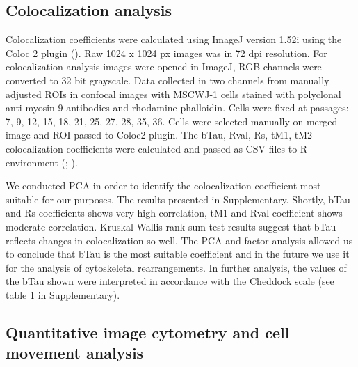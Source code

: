 \documentclass[alpha-refs]{wiley-article}
\begin{document}
\subsection{Colocalization analysis}

Colocalization coefficients were calculated using ImageJ version 1.52i using the Coloc 2 plugin (\cite{rueden2017imagej2}).
Raw 1024 x 1024 px images was in 72 dpi resolution.
For colocalization analysis images were opened in ImageJ, RGB channels were converted to 32 bit grayscale.
Data collected in two channels from manually adjusted ROIs in confocal images with MSCWJ-1 cells stained with polyclonal anti-myosin-9 antibodies and rhodamine phalloidin. Cells were fixed at passages: 7, 9, 12, 15, 18, 21, 25, 27, 28, 35, 36.
Cells were selected manually on merged image and ROI passed to Coloc2 plugin.
The bTau, Rval, Rs, tM1, tM2 colocalization coefficients were calculated and passed as CSV files to R environment (\cite{adler2008replicate}; \cite{bergholm2010analysis}).

We conducted PCA in order to identify the colocalization coefficient most suitable for our purposes.
The results presented in Supplementary.
Shortly, bTau and Rs coefficients shows very high correlation, tM1 and Rval coefficient shows moderate correlation.
Kruskal-Wallis rank sum test results suggest that bTau reflects changes in colocalization so well.
The PCA and factor analysis allowed us to conclude that bTau is the most suitable coefficient and in the future we use it for the analysis of cytoskeletal rearrangements.
In further analysis, the values of the bTau shown were interpreted in accordance with the Cheddock scale (see table 1 in Supplementary).

\subsection{Quantitative image cytometry and cell movement analysis}
\end{document}
